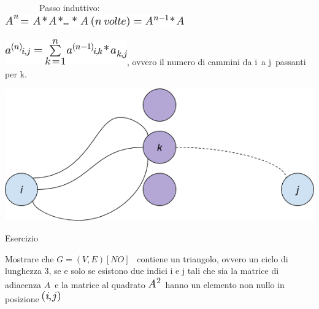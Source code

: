 \documentclass{article}
\begin{document}
{~~~~~~~~Passo induttivo:\\
\hspace*{0.333em}\hspace*{0.333em}\hspace*{0.333em}\hspace*{0.333em}\hspace*{0.333em}\hspace*{0.333em}\hspace*{0.333em}\hspace*{0.333em}\hspace*{0.333em}\hspace*{0.333em}\hspace*{0.333em}\hspace*{0.333em}\hspace*{0.333em}\hspace*{0.333em}\hspace*{0.333em}\hspace*{0.333em}}\includegraphics{images/image418.png}

\includegraphics{images/image419.png}{, ovvero il
numero di cammini da }{i}{~a }{j}{~passanti per }{k}{.}

{\includegraphics{images/image538.png}}

{}

{Esercizio}

{Mostrare che }$G=(V,E) [NO]$ {~contiene un
}{triangolo}{, ovvero un ciclo di lunghezza 3, se e solo se esistono due
indici i e j tali che sia la matrice di adiacenza
}$A${~e la matrice al quadrato
}\includegraphics{images/image421.png}{~hanno un elemento non nullo in
posizione }\includegraphics{images/image422.png}
\end{document}
